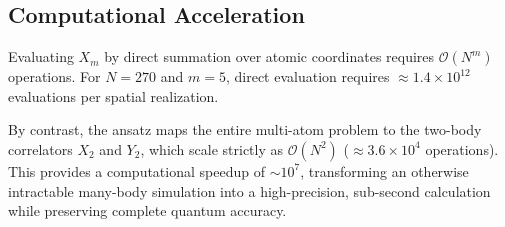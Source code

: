 \documentclass[11pt,a4paper]{article}
\begin{document}
\subsection{Computational Acceleration}
Evaluating $X_m$ by direct summation over atomic coordinates requires $\mathcal{O}(N^m)$ operations. For $N = 270$ and $m = 5$, direct evaluation requires $\approx 1.4 \times 10^{12}$ evaluations per spatial realization. 

By contrast, the ansatz maps the entire multi-atom problem to the two-body correlators $X_2$ and $Y_2$, which scale strictly as $\mathcal{O}(N^2)$ ($\approx 3.6 \times 10^4$ operations). This provides a computational speedup of $\sim 10^7$, transforming an otherwise intractable many-body simulation into a high-precision, sub-second calculation while preserving complete quantum accuracy.
\end{document}
